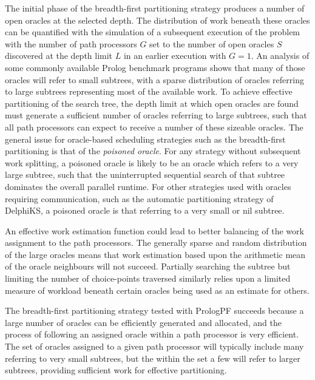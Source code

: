 The initial phase of the breadth-first partitioning strategy produces
a number of open oracles at the selected depth.  The distribution of
work beneath these oracles can be quantified with the simulation of 
a subsequent execution of the problem with the number of path processors
$G$ set to the number of open oracles $S$ discovered at the depth limit
$L$ in an earlier execution with $G=1$.
An analysis of some commonly available Prolog benchmark programs shows
that many of those oracles will refer to small subtrees, with
a sparse distribution of oracles referring to large subtrees
representing most of the available work.
To achieve effective partitioning of the search tree, the depth limit
at which open oracles are found must generate a sufficient number of
oracles referring to large subtrees, such that all path processors can
expect to receive a number of these sizeable oracles.  The general
issue for oracle-based scheduling strategies such as the 
breadth-first partitioning is that of the
\textit{poisoned oracle}.  For any strategy without subsequent work
splitting, a poisoned oracle is likely to be an oracle which refers
to a very large subtree, such that the uninterrupted sequential search of
that subtree dominates the overall parallel runtime.  For other
strategies used with oracles requiring communication, 
such as the automatic partitioning strategy of DelphiKS, a poisoned oracle
is that referring to a very small or nil subtree.

An effective work estimation function could lead to better balancing of
the work assignment to the path processors.  The generally sparse
and random distribution of the large oracles means that work estimation
based upon the arithmetic mean of the oracle neighbours will not
succeed.  Partially searching the subtree but limiting the number of
choice-points traversed similarly relies upon a limited measure of
workload beneath certain oracles being used as an estimate for others.

The breadth-first partitioning strategy tested with PrologPF succeeds because
a large number of oracles can be efficiently generated and allocated, and the
process of following an assigned oracle within a path processor is
very efficient.  The set of oracles assigned to a given path processor will
typically include many referring to very small subtrees, but the within the
set a few will refer to larger subtrees, providing sufficient work for effective
partitioning.

